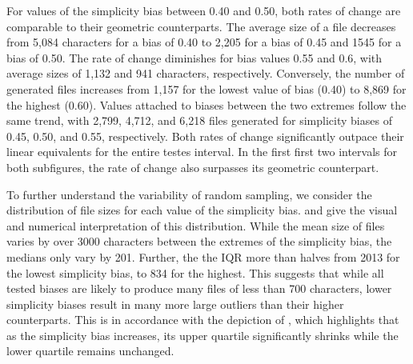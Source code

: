 For values of the simplicity bias between 0.40 and 0.50, both rates of change
are comparable to their geometric counterparts.
The average size of a file decreases from 5,084 characters for a bias of 0.40
to 2,205 for a bias of 0.45 and 1545 for a bias of 0.50.
The rate of change diminishes for bias values 0.55 and 0.6, with
average sizes of 1,132 and 941 characters, respectively.
Conversely, the number of generated files increases from 
1,157 for the lowest value of bias (0.40) to 8,869 for the highest (0.60).
Values attached to biases between the two extremes follow the same trend,
with 2,799, 4,712, and 6,218 files generated for simplicity biases of
0.45, 0.50, and 0.55, respectively.
Both rates of change significantly outpace their linear equivalents for the entire testes interval.
In the first first two intervals for both subfigures,
the rate of change also surpasses its geometric counterpart.

To further understand the variability of random sampling, we consider
the distribution of file sizes for each value of the simplicity bias.
 and  give the
visual and numerical interpretation of this distribution.
While the mean size of files varies by over 3000 characters between the
extremes of the simplicity bias, the medians only vary by 201.
Further, the the \gls{IQR} more than halves from 2013 for the lowest
simplicity bias, to 834 for the highest.
This suggests that while all tested biases are likely to produce
many files of less than 700 characters, lower simplicity biases
result in many more large outliers than their higher counterparts.
This is in accordance with the depiction of ,
which highlights that as the simplicity bias increases, its upper quartile
significantly shrinks while the lower quartile remains unchanged.

